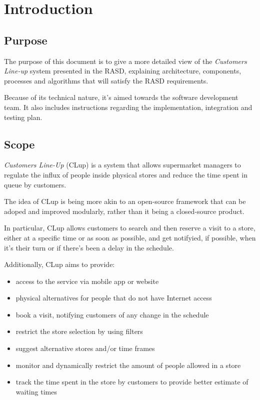
\section{Introduction}

\subsection{Purpose}

The purpose of this document is to give a more detailed view of the \emph{Customers Line-up} system presented in the RASD, explaining architecture, components, processes and algorithms that will satisfy the RASD requirements.

Because of its technical nature, it's aimed towards the software development team. It also includes instructions regarding the implementation, integration and testing plan.

\subsection{Scope}

\emph{Customers Line-Up} (CLup) is a system that allows supermarket managers to regulate the influx of people inside physical stores and reduce the time spent in queue by customers.

The idea of CLup is being more akin to an open-source framework that can be adoped and improved modularly, rather than it being a closed-source product.

In particular, CLup allows customers to search and then reserve a visit to a store, either at a specific time or as soon as possible, and get notifyied, if possible, when it's their turn or if there's been a delay in the schedule.

Additionally, CLup aims to provide:
\begin{itemize}
    \item access to the service via mobile app or website
    \item physical alternatives for people that do not have Internet access
    \item book a visit, notifying customers of any change in the schedule
    \item restrict the store selection by using filters
    \item suggest alternative stores and/or time frames
    \item monitor and dynamically restrict the amount of people allowed in a store
    \item track the time spent in the store by customers to provide better estimate of waiting times
\end{itemize}


